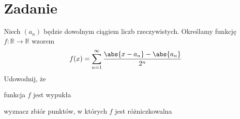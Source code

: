 \documentclass[11pt]{scrartcl}
\begin{document}
      \section{Zadanie}
        \begin{zadanie}
            Niech $(a_n)$ będzie dowolnym ciągiem liczb rzeczywistych. Określamy funkcję $f : \mathbb{R}  \to \mathbb{R} $ wzorem
            \[
              f(x) = \sum_{n = 1}^{\infty } \frac{\abs{x - a_n} - \abs{a_n}}{2^n}
            \]
            Udowodnij, że
            \begin{walk}
                \item funkcja $f$ jest wypukła
                \item wyznacz zbiór punktów, w których $f$ jest różniczkowalna 
            \end{walk}
            
        \end{zadanie}
\end{document}
